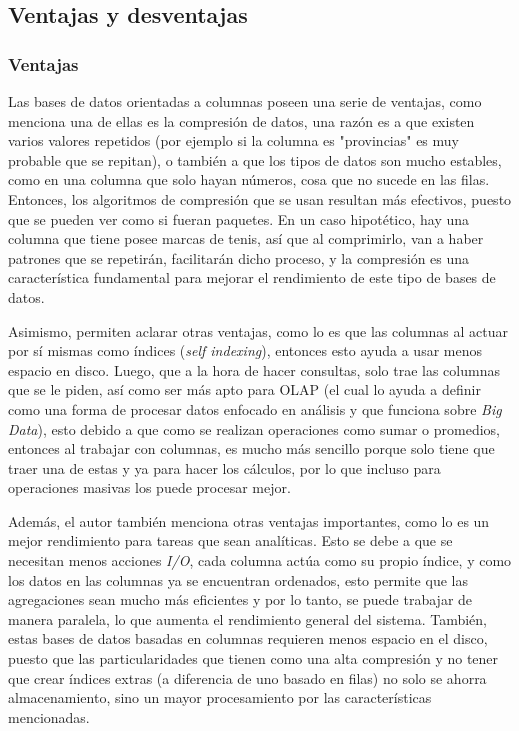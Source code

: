 \subsection{Ventajas y desventajas}
 \subsubsection{Ventajas}
 Las bases de datos orientadas a columnas poseen una serie de ventajas, como menciona \textcite{abadi2013} una de ellas es la compresión de datos, una razón es a que existen varios valores repetidos (por ejemplo si la columna es "provincias" es muy probable que se repitan), o también a que los tipos de datos son mucho estables, como en una columna que solo hayan números, cosa que no sucede en las filas. Entonces, los algoritmos de compresión que se usan resultan más efectivos, puesto que se pueden ver como si fueran paquetes. En un caso hipotético, hay una columna que tiene posee marcas de tenis, así que al comprimirlo, van a haber patrones que se repetirán, facilitarán dicho proceso, y la compresión es una característica fundamental para mejorar el rendimiento de este tipo de bases de datos.

 Asimismo, \textcite{saeed2020} permiten aclarar otras ventajas, como lo es que las columnas al actuar por sí mismas como índices (\textit{self indexing}), entonces esto ayuda a usar menos espacio en disco. Luego, que a la hora de hacer consultas, solo trae las columnas que se le piden, así como ser más apto para OLAP (el cual \textcite{pathania2022} lo ayuda a definir como una forma de procesar datos enfocado en análisis y que funciona sobre \textit{Big Data}), esto debido a que como se realizan operaciones como sumar o promedios, entonces al trabajar con columnas, es mucho más sencillo porque solo tiene que traer una de estas y ya para hacer los cálculos, por lo que incluso para operaciones masivas los puede procesar mejor.

 Además, el autor \textcite{matei2010} también menciona otras ventajas importantes, como lo es un mejor rendimiento para tareas que sean analíticas. Esto se debe a que se necesitan menos acciones \textit{I/O}, cada columna actúa como su propio índice, y como los datos en las columnas ya se encuentran ordenados, esto permite que las agregaciones sean mucho más eficientes y por lo tanto, se puede trabajar de manera paralela, lo que aumenta el rendimiento general del sistema. También, estas bases de datos basadas en columnas requieren menos espacio en el disco, puesto que las particularidades que tienen como una alta compresión y no tener que crear índices extras (a diferencia de uno basado en filas) no solo se ahorra almacenamiento, sino un mayor procesamiento por las características mencionadas.

